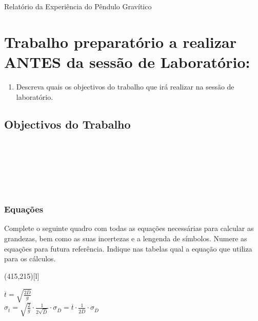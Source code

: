 \documentclass[a4paper,12pt]{article}      %
\author{Prof. Bernardo B. Carvalho}
\date{ Outubro 2017}
\begin{document}
 
{  \sf  Relatório da Experiência do Pêndulo Gravítico} %




\section{\sf Trabalho preparatório a realizar ANTES da sessão de Laboratório:}
\begin{enumerate}
\item Descreva quais os objectivos do trabalho que irá realizar na sessão de laboratório. 
\end{enumerate}

\subsection{\sf Objectivos do Trabalho}
\noindent\underline{\makebox[\textwidth][r]{~}} \\
\noindent\underline{\makebox[\textwidth][r]{~}} \\
\noindent\underline{\makebox[\textwidth][r]{~}} \\
\noindent\underline{\makebox[\textwidth][r]{~}} \\
\noindent\underline{\makebox[\textwidth][r]{~}} \\

\subsubsection{\sf Equações }
Complete o seguinte quadro com todas as equações necessárias para calcular as grandezas, bem como as suas incertezas e a lengenda de símbolos.  
Numere as equações para futura referência. Indique nas tabelas qual a equação que utiliza para os cálculos.



\framebox(415,215)[l]{%
    \parbox[t][150\unitlength]{215\unitlength}{$\overline{t}=\sqrt{\frac{2 \overline{D}}{g}}$\\
    $\sigma_{\overline{t}}=\sqrt{\frac{2 }{g}} \cdot \frac{1}{2\sqrt{\overline{D}}} \cdot \sigma_{\overline{D}}  
      = \overline{t} \cdot \frac{1}{2\overline{D}} \cdot \sigma_{\overline{D}} $
  }%
}
\end{document}

